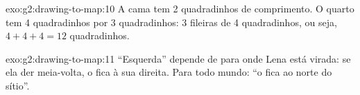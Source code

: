 \begin{solution}{exo:g2:drawing-to-map:10}
A cama tem 2 quadradinhos de comprimento. O quarto tem 4 quadradinhos por 3
quadradinhos: 3 fileiras de 4 quadradinhos, ou seja, $4 + 4 + 4 = 12$ quadradinhos.
\end{solution}

\begin{solution}{exo:g2:drawing-to-map:11}
``Esquerda'' depende de para onde Lena está virada: se ela der meia-volta,
o  fica à sua direita. Para todo mundo: ``o  fica ao norte do sítio''.
\end{solution}
